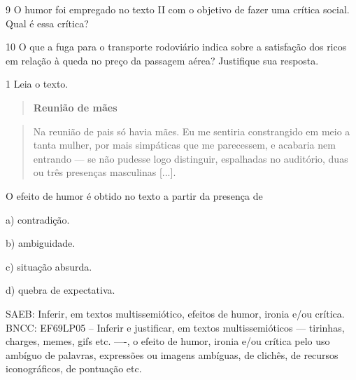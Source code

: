 
\num{9} O humor foi empregado no texto II com o objetivo de fazer uma
crítica social. Qual é essa crítica?


\num{10} O que a fuga para o transporte rodoviário indica sobre a
satisfação dos ricos em relação à queda no preço da passagem aérea?
Justifique sua resposta.



\num{1} Leia o texto.

\begin{quote}
\textbf{Reunião de mães}
\end{quote}

\begin{quote}
Na reunião de pais só havia mães. Eu me sentiria constrangido em meio a
tanta mulher, por mais simpáticas que me parecessem, e acabaria nem
entrando --- se não pudesse logo distinguir, espalhadas no auditório,
duas ou três presenças masculinas {[}...{]}.
\end{quote}


O efeito de humor é obtido no texto a partir da presença de

a) contradição.

b) ambiguidade.

c) situação absurda.

d) quebra de expectativa.

SAEB: Inferir, em textos multissemiótico, efeitos de humor, ironia e/ou
crítica. BNCC: EF69LP05 -- Inferir e justificar, em textos
multissemióticos --- tirinhas, charges, memes, gifs etc. ----, o efeito
de humor, ironia e/ou crítica pelo uso ambíguo de palavras, expressões
ou imagens ambíguas, de clichês, de recursos iconográficos, de pontuação
etc.

